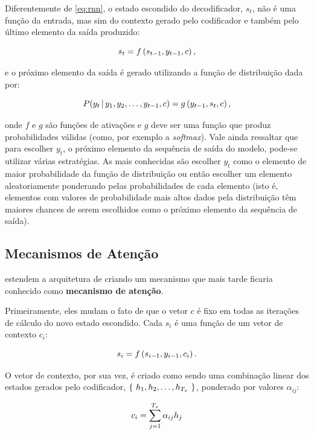Diferentemente de \ref{eq:rnn}, o estado escondido do decodificador, $s_t$, não
é uma função da entrada, mas sim do contexto gerado pelo codificador e também
pelo último elemento da saída produzido:

\begin{equation}
s_t = f\paren{s_{t-1}, y_{t-1}, c},
\label{rnn-decoder}
\end{equation}

e o próximo elemento da saída é gerado utilizando a função de distribuição dada
por:

\begin{equation}
P(y_t\,|\,y_1, y_2,\dots, y_{t-1},c)=g\left( y_{t-1},s_t,c \right),
\end{equation}

onde $f$ e $g$ são funções de ativações e $g$ deve ser uma função que produz
probabilidades válidas (como, por exemplo a \textit{softmax}). Vale ainda
ressaltar que para escolher $y_t$, o próximo elemento da sequência de saída do
modelo, pode-se utilizar várias estratégias. As mais conhecidas são escolher
$y_t$ como o elemento de maior probabilidade da função de distribuição ou então
escolher um elemento aleatoriamente ponderando pelas probabilidades de cada
elemento (isto é, elementos com valores de probabilidade mais altos dados pela
distribuição têm maiores chances de serem escolhidos como o próximo elemento da
sequência de saída).

\subsection{Mecanismos de Atenção}%
\label{sub:mecanismos_de_atencao}

\cite{bahdanau-etal:2014:attention-mechanism} estendem a arquitetura de
\cite{cho-etal:2014:rnn-encoder-decoder} criando um mecanismo que mais tarde
ficaria conhecido como \textbf{mecanismo de atenção}.

Primeiramente, eles mudam o fato de que o vetor $c$ é fixo em todas as iterações
de cálculo do novo estado escondido. Cada $s_i$ é uma função de um vetor de
contexto $c_i$:

\begin{equation}
  s_i=f\left( s_{i-1},y_{i-1},c_i \right).
\end{equation}

O vetor de contexto, por sua vez, é criado como sendo uma combinação linear dos
estados gerados pelo codificador, $\left\{ \ h_1, h_2,\dots, h_{T_x}\  \right\}$, ponderado por valores
$\alpha_{ij}$:

\begin{equation}
  c_i=\spsum{j=1}{T_x}\alpha_{ij}h_j
  \label{eq:attention}
\end{equation}

